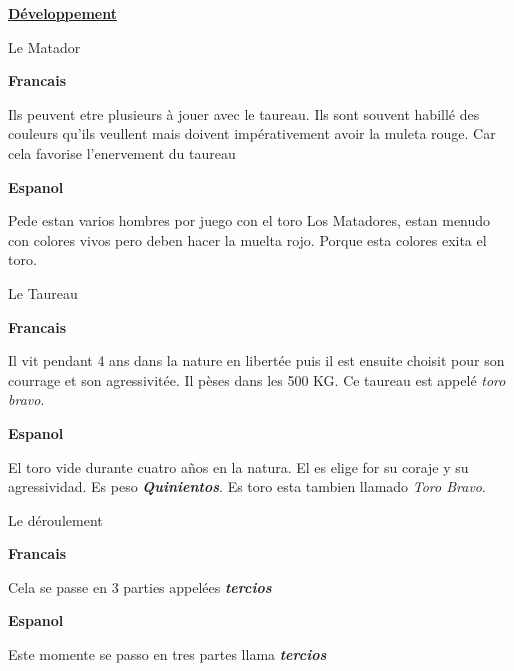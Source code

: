 \documentclass[12pt,a4paper]{article}
\begin{document}
		\begin{dev}
		\noindent	\textbf{\underline{Développement}}\par
	\color{blue}	
		\item Le Matador \par
	\color{red}	
\textbf{	Francais} \par
		Ils peuvent etre plusieurs à jouer avec le taureau.
		Ils sont souvent habillé des couleurs qu'ils veullent mais doivent impérativement avoir la muleta rouge.
		Car cela favorise l'enervement du taureau\par
%
	\color{black}	
\textbf{Espanol} \par
	Pede estan varios hombres por juego con el toro
	Los Matadores, estan menudo con colores vivos pero deben hacer la muelta rojo.
	Porque esta colores exita el toro.



	\color{blue}	
		\item Le Taureau \par
	\color{red}	
\textbf{	Francais} \par

		Il vit pendant 4 ans dans la nature en libertée puis il est ensuite choisit pour son courrage et son agressivitée.
		Il pèses dans les 500 KG. Ce taureau est appelé \textit{toro bravo}.\par
	\color{black}	
\textbf{Espanol} \par
		El toro vide durante cuatro a\~nos en la natura.
		El es elige for su coraje y su agressividad.
		Es peso \textit{\textbf{Quinientos}}.
		Es toro esta tambien llamado \textit{Toro Bravo}.

	\color{blue}	
		\item Le déroulement \par
	\color{red}	
\textbf{	Francais} \par
		Cela se passe en 3 parties appelées \textbf{\textit{tercios}} \par
	\color{black}	
\textbf{Espanol} \par
		Este momente se passo en tres partes llama \textbf{\textit{tercios}}





\end{dev}
\end{document}
